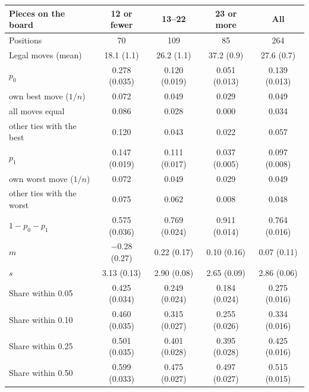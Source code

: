 \begin{tabular}{lcccc}
\toprule
Pieces on the board & 12 or fewer & 13--22 & 23 or more & All \\
\midrule
Positions & 70 & 109 & 85 & 264 \\
Legal moves (mean) & 18.1 (1.1) & 26.2 (1.1) & 37.2 (0.9) & 27.6 (0.7) \\
\addlinespace
$p_0$ & 0.278 (0.035) & 0.120 (0.019) & 0.051 (0.013) & 0.139 (0.013) \\
\quad own best move ($1/n$) & 0.072 & 0.049 & 0.029 & 0.049 \\
\quad all moves equal & 0.086 & 0.028 & 0.000 & 0.034 \\
\quad other ties with the best & 0.120 & 0.043 & 0.022 & 0.057 \\
$p_1$ & 0.147 (0.019) & 0.111 (0.017) & 0.037 (0.005) & 0.097 (0.008) \\
\quad own worst move ($1/n$) & 0.072 & 0.049 & 0.029 & 0.049 \\
\quad other ties with the worst & 0.075 & 0.062 & 0.008 & 0.048 \\
$1-p_0-p_1$ & 0.575 (0.036) & 0.769 (0.024) & 0.911 (0.014) & 0.764 (0.016) \\
$m$ & $-$0.28 (0.27) & 0.22 (0.17) & 0.10 (0.16) & 0.07 (0.11) \\
$s$ & 3.13 (0.13) & 2.90 (0.08) & 2.65 (0.09) & 2.86 (0.06) \\
\addlinespace
Share within 0.05 & 0.425 (0.034) & 0.249 (0.024) & 0.184 (0.024) & 0.275 (0.016) \\
Share within 0.10 & 0.460 (0.035) & 0.315 (0.027) & 0.255 (0.026) & 0.334 (0.016) \\
Share within 0.25 & 0.501 (0.035) & 0.401 (0.028) & 0.395 (0.028) & 0.425 (0.016) \\
Share within 0.50 & 0.599 (0.033) & 0.475 (0.027) & 0.497 (0.027) & 0.515 (0.015) \\
\bottomrule
\end{tabular}
